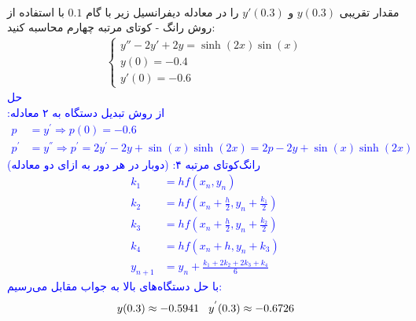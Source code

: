 \\
مقدار تقریبی
$y(0.3)$
و 
$y'(0.3)$ 
را در معادله دیفرانسیل زیر با گام 
$0.1$
با استفاده از روش رانگ - کوتای مرتبه چهارم محاسبه کنید:
\begin{align*}
\begin{cases}
y'' - 2y' + 2y = \sinh(2x) \sin(x) \\
y(0) = -0.4 \\
y'(0) = -0.6
\end{cases}
\end{align*}
\textcolor{blue}{حل
\\
از روش تبدیل دستگاه به ۲ معادله:
\begin{align*}
    p &= y^{'} \Rightarrow p(0) = -0.6 \\
    p^{'} &= y^{''} \Rightarrow p^{'} = 2y^{'} - 2y + \sin(x) \sinh(2x) = 2p - 2y + \sin(x) \sinh(2x)
\end{align*}
رانگ‌کوتای مرتبه ۴: (دوبار در هر دور به ازای دو معادله)
\begin{align*}
    k_1 &= h f(x_n, y_n) \\
    k_2 &= hf(x_n + \frac{h}{2}, y_n + \frac{k_1}{2}) \\
    k_3 &= h f(x_n + \frac{h}{2}, y_n + \frac{k_2}{2}) \\
    k_4 &= hf(x_n + h, y_n + k_3) \\
    y_{n + 1} &= y_{n} + \frac{k_1 + 2k_2 + 2k_3 + k_4}{6}
\end{align*}
با حل دستگاه‌های بالا به جواب مقابل می‌رسیم:
\begin{align*}
    y(0.3) \approx -0.5941 \hspace{0.3 cm} y^{'}(0.3) \approx -0.6726
\end{align*}
}